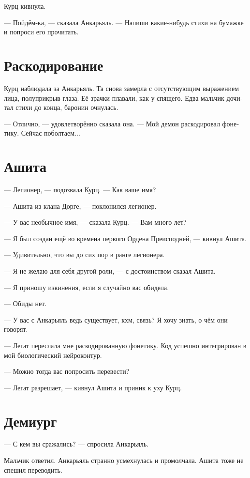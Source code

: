 \documentclass[a4paper,10pt,fleqn]{book}\usepackage{polyglossia}\setdefaultlanguage[babelshorthands=true]{russian}\setotherlanguage{english}\defaultfontfeatures{Ligatures=TeX,Mapping=tex-text}\usepackage{xcolor}\newcommand{\ml}[3]{#2}
\begin{document}
Курц кивнула.

--- Пойдём-ка, --- сказала Анкарьяль.
--- Напиши какие-нибудь стихи на бумажке и попроси его прочитать.

\section{Раскодирование}

Курц наблюдала за Анкарьяль.
Та снова замерла с отсутствующим выражением лица, полуприкрыв глаза.
Её зрачки плавали, как у спящего.
Едва мальчик дочитал стихи до конца, баронин очнулась.

--- Отлично, --- удовлетворённо сказала она.
--- Мой демон раскодировал фонетику.
Сейчас поболтаем...

\section{Ашита}

--- Легионер, --- подозвала Курц.
--- Как ваше имя?

--- Ашита из клана Дорге, --- поклонился легионер.

--- У вас необычное имя, --- сказала Курц.
--- Вам много лет?

--- Я был создан ещё во времена первого Ордена Преисподней, --- кивнул Ашита.

--- Удивительно, что вы до сих пор в ранге легионера.

--- Я не желаю для себя другой роли, --- с достоинством сказал Ашита.

--- Я приношу извинения, если я случайно вас обидела.

--- Обиды нет.

--- У вас с Анкарьяль ведь существует, кхм, связь?
Я хочу знать, о чём они говорят.

--- Легат переслала мне раскодированную фонетику.
Код успешно интегрирован в мой биологический нейроконтур.

--- Можно тогда вас попросить перевести?

--- Легат разрешает, --- кивнул Ашита и приник к уху Курц.

\section{Демиург}

--- С кем вы сражались? --- спросила Анкарьяль.

Мальчик ответил.
Анкарьяль странно усмехнулась и промолчала.
Ашита тоже не спешил переводить.
\end{document}
